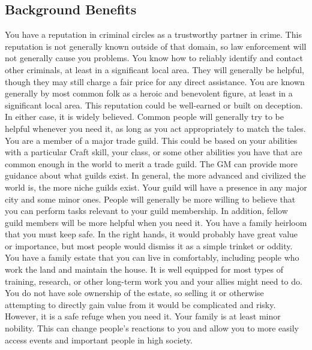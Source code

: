   \subsection{Background Benefits}
     You have a reputation in criminal circles as a trustworthy partner in crime.
    This reputation is not generally known outside of that domain, so law enforcement will not generally cause you problems.
    You know how to reliably identify and contact other criminals, at least in a significant local area.
    They will generally be helpful, though they may still charge a fair price for any direct assistance.
     You are known generally by most common folk as a heroic and benevolent figure, at least in a significant local area.
    This reputation could be well-earned or built on deception.
    In either case, it is widely believed.
    Common people will generally try to be helpful whenever you need it, as long as you act appropriately to match the tales.
     You are a member of a major trade guild.
    This could be based on your abilities with a particular Craft skill, your class, or some other abilities you have that are common enough in the world to merit a trade guild.
    The GM can provide more guidance about what guilds exist.
    In general, the more advanced and civilized the world is, the more niche guilds exist.
    Your guild will have a presence in any major city and some minor ones.
    People will generally be more willing to believe that you can perform tasks relevant to your guild membership.
    In addition, fellow guild members will be more helpful when you need it.
     You have a family heirloom that you must keep safe.
    In the right hands, it would probably have great value or importance, but most people would dismiss it as a simple trinket or oddity.
     You have a family estate that you can live in comfortably, including people who work the land and maintain the house.
    It is well equipped for most types of training, research, or other long-term work you and your allies might need to do.
    You do not have sole ownership of the estate, so selling it or otherwise attempting to directly gain value from it would be complicated and risky.
    However, it is a safe refuge when you need it.
     Your family is at least minor nobility.
    This can change people's reactions to you and allow you to more easily access events and important people in high society.

